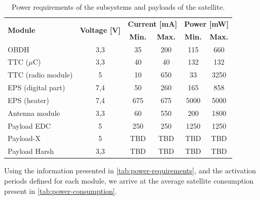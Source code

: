 \begin{table}[!h]
    \centering
    \begin{tabular}{lccccc}
        \toprule[1.5pt]
        \multirow{2}{*}{\textbf{Module}} & \multirow{2}{*}{\textbf{Voltage [V]}}    & \multicolumn{2}{c}{\textbf{Current [mA]}} & \multicolumn{2}{c}{\textbf{Power [mW]}} \\
                                         &                                          & \textbf{Min.} & \textbf{Max.}             & \textbf{Min.} & \textbf{Max.} \\
        \midrule
        OBDH                & 3,3   & 35    & 200   & 115   & 660 \\
        TTC ($\mu$C)        & 3,3   & 40    & 40    & 132   & 132 \\
        TTC (radio module)  & 5     & 10    & 650   & 33    & 3250 \\
        EPS (digital part)  & 7,4   & 50    & 260   & 165   & 858 \\
        EPS (heater)        & 7,4   & 675   & 675   & 5000  & 5000 \\
        Antenna module      & 3,3   & 60    & 550   & 200   & 1800 \\
        Payload EDC         & 5     & 250   & 250   & 1250  & 1250 \\
        Payload-X           & 5     & TBD   & TBD   & TBD   & TBD \\
        Payload Harsh       & 3,3   & TBD   & TBD   & TBD   & TBD \\
        \bottomrule[1.5pt]
    \end{tabular}
    \caption{Power requirements of the subsystems and payloads of the satellite.}
    \label{tab:power-requirements}
\end{table}

Using the information presented in \autoref{tab:power-requirements}, and the activation periods defined for each module, we arrive at the average satellite consumption present in \autoref{tab:power-consumption}.

